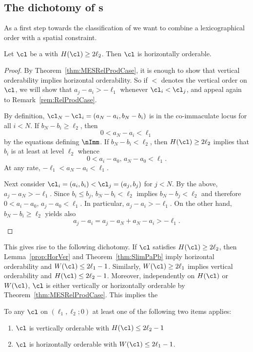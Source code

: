 \subsection{The dichotomy of {\mes}s}
\label{subsec:DichoMESPC}
As a first step towards the classification
of {\mes} we want to combine a lexicographical
order with a spatial constraint.

\begin{lemma}
\label{prop:HorVer}
Let $\cl$ be a {\mes} with $H(\cl)\geq2\ell_2$.
Then $\cl$ is horizontally orderable.
\end{lemma}

\begin{proof}
{By Theorem~\ref{thm:MESRelProdCase}, it is enough
to show that vertical orderability
implies horizontal orderability. So if
$<$ denotes the vertical order
on $\cl$, we will show that $a_j-a_i>-\ell_1$ 
whenever $\cl_i<\cl_j$, and appeal again to 
Remark~\ref{rem:RelProdCase}.}

By definition, 
$\cl_N-\cl_i=(a_N-a_i,b_N-b_i)$
is in the {co-immaculate} locus for all $i<N$. 
If $b_N-b_i\geq\ell_2$, then  
$$
0<a_N-a_i<\ell_1
$$
by the equations defining $\nImm$. 
If $b_N-b_i<\ell_2$, then 
$H(\cl)\geq2\ell_2$ implies that $b_i$ is 
at least at level $\ell_2$ whence 
$$
0<a_i-a_0,\,a_N-a_0<\ell_1.
$$
At any rate, $-\ell_1<a_N-a_i<\ell_1$.

Next consider $\cl_i=(a_i,b_i)<
\cl_j=(a_j,b_j)$ for $j<N$. By the above,
$a_j-a_N>-\ell_1$. Since $b_i\leq b_j$,
$b_N-b_i<\ell_2$ implies $b_N-b_j<\ell_2$
and therefore $0<a_i-a_0,\,a_j-a_0<\ell_1$. 
In particular, $a_j-a_i>-\ell_1$. On the
other hand, $b_N-b_i\geq\ell_2$ yields
also
$$
a_j-a_i=a_j-a_N+a_N-a_i>-\ell_1.
$$
\end{proof}

This gives rise to the following dichotomy. 
If $\cl$ satisfies
$H(\cl)\geq2\ell_2$, then Lemma~\ref{prop:HorVer} 
and Theorem~\ref{thm:SlimPaPb} imply 
horizontal orderability and $W(\cl)\leq
2\ell_1-1$. Similarly, 
$W(\cl)\geq2\ell_1$ implies 
vertical orderability and $H(\cl)\leq2\ell_2-1$.
Moreover, independently on $H(\cl)$ or $W(\cl)$,
$\cl$ is either vertically 
or horizontally orderable by 
Theorem~\ref{thm:MESRelProdCase}. This 
implies the

\begin{theorem}
\label{thm:Dichotomy}
To any {\mes} $\cl$ on $(\ell_1,\ell_2;0)$
at least one of the following two items applies:
\begin{enumerate}
\item[(i)] $\cl$ is vertically orderable with 
$H(\cl)\leq2\ell_2-1$
\vspace{1ex}
\item[(ii)] $\cl$ is horizontally orderable 
with $W(\cl)\leq2\ell_1-1$.
\end{enumerate}
\end{theorem}

